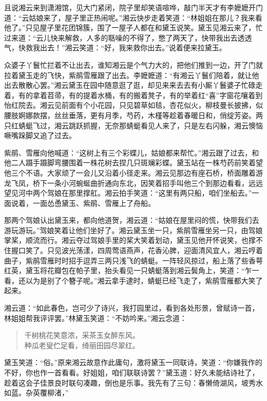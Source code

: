 \documentclass[12pt,oneside]{book}
\newenvironment{shici}{%
\begin{verse}%
\centering\large\hspace{12pt}}%
{\end{verse}}
\begin{document}
且说湘云来到潇湘馆，见大门紧闭，院子里却笑语喧哗，敲门半天才有李嬷嬷开门道：“云姑娘来了，屋子里正热闹呢。”湘云快步走着笑道：“林姐姐在那儿？我来看他了。”只见屋子里花团锦簇，围了一屋子人都在和黛玉说笑。黛玉见湘云来了，忙过来道：“云儿快来解救，人多的聒噪的不得了，憋了两天了，快带我出去透透气，快救我出去！”湘云笑道：“好，我来救你出去。”说着便来拉黛玉。

众婆子丫鬟忙拦着不让出去，谁知湘云是个气力大的，把他们推到一边，开了门就拉着黛玉走的飞快，紫鹃雪雁跟了出去。李嬷嬷道：“有湘云丫鬟们陪着，就让他出去散散心罢。”湘云黛玉在园中随意逛了逛，却见来来去去有小厮丫鬟婆子忙碌走着，有的拿着苕帚，有的提着水桶，有的搬着凳子，有的举着红“喜”字窗花嚷着到怡红院去。湘云见前面有个小花园，只见碧草如毯，杏花似火，柳枝曼长披拂，似腰肢婀娜款摆，丝丝垂落，更有月季，芍药，木槿等趁着春暖日和，俏绽芳姿。两只红蜻蜓飞过，湘云跳跃抓握，无奈那蜻蜓看见人来了，只是左右闪躲，湘云懊恼噘嘴跺脚又追了过去。

紫鹃、雪雁向他喊道：“这树上有三个彩蝶儿，姑娘都来帮忙。”湘云跟了过去，和他二人蹑手蹑脚弯腰围着一株花树去捏几只斑斓彩蝶。黛玉站在一株芍药前笑着望他三个不语。大家顽了一会儿又沿着小径走来。湘云见那边有座石桥，桥面雕着游龙飞凤，桥下一条小河蜿蜒曲折通向东北，因笑着招手叫他三个到那边看看，远远望见河中两个驾娘在那里撑舡。湘云拍手笑道：“这里有两只船，咱们坐船去。”一面说着，一面怂恿黛玉、紫鹃、雪雁上了舟船。

那两个驾娘认出黛玉来，都向他道贺，湘云道：“姑娘在屋里闷的慌，快带我们去游玩游玩。”驾娘笑着让他们坐好了。湘云黛玉坐一只，紫鹃雪雁坐另一只，由驾娘掌桨，顺流而行。湘云夺过驾娘手里的桨大笑着划动，黛玉见他开怀说笑，也撑不住握口笑了。只见波光荡漾，四周莺语燕声，花香沁脾，迎面清风宜人，湘云哼着曲子，紫鹃雪雁时时招手逗弄三两只浅飞的蜻蜓。一阵轻风掠过，船上落了些香萼红英，黛玉将花瓣包在帕子里，抬头看见一只蜻蜓落到湘云鬓角上，笑道：“乍一看，还以为是别了个簪子呢。”湘云拿手逮时，蜻蜓已经飞走了，紫鹃雪雁都大笑了起来。

湘云道：“如此春色，岂可少了诗兴，我打园里过，看到各处形景，曾赋诗一首，林姐姐帮我评评罢。”林黛玉笑道：“不妨吟来。”湘云念道：

\begin{shici}
千树桃花笑意浓，采茶玉女醉东风。\\
种瓜老叟伫足看，绮丽田园尽翠红。
\end{shici}

黛玉笑道：“俗。”原来湘云故意作此庸句，激将黛玉一同联诗，笑道：“你嫌我作的不好，你也作一首看看。好姐姐，咱们联联诗罢？”黛玉道：好久未能结诗社了，趁着这会子佳景良时联句凑趣，倒也是乐事。我先有了三句：春懒倚湖风，坡秀水如蓝。杂英覆柳渚，”
\end{document}
